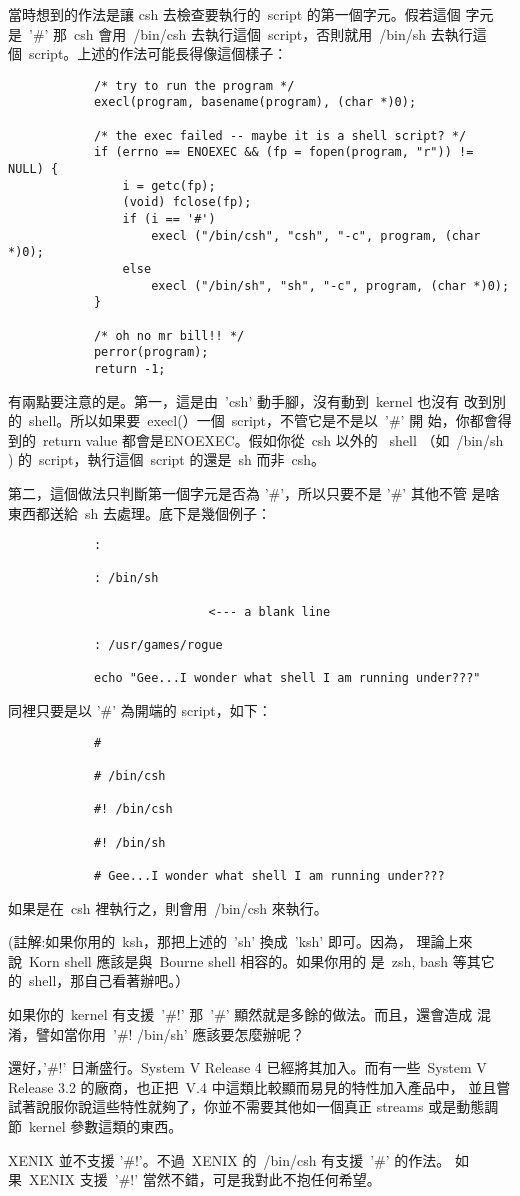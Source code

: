 \documentclass{article}
\begin{document}
\begin{CJK*}{Bg5}{ming}
	當時想到的作法是讓 csh 去檢查要執行的~script 的第一個字元。假若這個
	字元是~'\#' 那~csh 會用~/bin/csh 去執行這個~script，否則就用~/bin/sh 
        去執行這個~script。上述的作法可能長得像這個樣子：
\small
\begin{verbatim}
	        /* try to run the program */
	        execl(program, basename(program), (char *)0);

	        /* the exec failed -- maybe it is a shell script? */
	        if (errno == ENOEXEC && (fp = fopen(program, "r")) != NULL) {
        	    i = getc(fp);
	            (void) fclose(fp);
	            if (i == '#')
	                execl ("/bin/csh", "csh", "-c", program, (char *)0);
	            else
        	        execl ("/bin/sh", "sh", "-c", program, (char *)0);
	        }

	        /* oh no mr bill!! */
	        perror(program);
	        return -1;
\end{verbatim}
\normalsize
	有兩點要注意的是。第一，這是由~'csh' 動手腳，沒有動到~kernel 也沒有
	改到別的~shell。所以如果要~execl(）一個~script，不管它是不是以~'\#' 開
	始，你都會得到的~return value 都會是ENOEXEC。假如你從~csh 以外的 
	~shell （如~/bin/sh ) 的~script，執行這個~script 的還是~sh 而非~csh。

	第二，這個做法只判斷第一個字元是否為 '\#'，所以只要不是 '\#' 其他不管
	是啥東西都送給~sh 去處理。底下是幾個例子：
\begin{verbatim}
	        :

	        : /bin/sh

	                        <--- a blank line

	        : /usr/games/rogue

	        echo "Gee...I wonder what shell I am running under???"
\end{verbatim}

	同裡只要是以 '\#' 為開端的 script，如下：
\begin{verbatim}
	        #

	        # /bin/csh

	        #! /bin/csh

	        #! /bin/sh

	        # Gee...I wonder what shell I am running under???
\end{verbatim}
	如果是在~csh 裡執行之，則會用~/bin/csh 來執行。

	(註解:如果你用的~ksh，那把上述的~'sh' 換成~'ksh' 即可。因為，
	理論上來說~Korn shell 應該是與~Bourne shell 相容的。如果你用的
	是~zsh, bash 等其它的~shell，那自己看著辦吧。）

	如果你的~kernel 有支援~'\#!' 那~'\#' 顯然就是多餘的做法。而且，還會造成
	混淆，譬如當你用~'\#! /bin/sh' 應該要怎麼辦呢？

	還好，'\#!' 日漸盛行。System V Release 4 已經將其加入。而有一些~System 
	V Release 3.2 的廠商，也正把~V.4 中這類比較顯而易見的特性加入產品中，
	並且嘗試著說服你說這些特性就夠了，你並不需要其他如一個真正 streams 
	或是動態調節~kernel 參數這類的東西。

	XENIX 並不支援 '\#!'。不過~XENIX 的~/bin/csh 有支援~'\#' 的作法。 如
	果~XENIX 支援~'\#!' 當然不錯，可是我對此不抱任何希望。
\end{CJK*}
\end{document}
